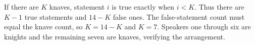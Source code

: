 If there are $K$ knaves, statement $i$ is true exactly when $i<K$. Thus there are $K-1$ true statements and $14-K$ false ones. The false-statement count must equal the knave count, so $K=14-K$ and $\boxed{K=7}$. Speakers one through six are knights and the remaining seven are knaves, verifying the arrangement.
